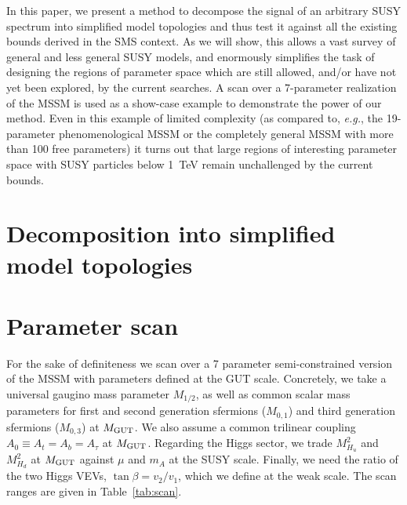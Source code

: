 \documentclass[12pt]{article}
\def\eg{{\it e.g.}}
\def\mgut{M_{\rm GUT}}
\begin{document}
In this paper, we present a method to decompose the signal of an arbitrary SUSY spectrum into simplified model  
topologies and thus test it against all the existing bounds derived in the SMS context. 
As we will show, this allows a vast survey of general and less general SUSY models, and enormously simplifies the task of designing the regions of parameter space which are still allowed, and/or have not yet been explored, by the current searches.
A scan over a 7-parameter realization of the MSSM is used as a show-case example to demonstrate the power of our method. 
Even in this example of limited complexity (as compared to, \eg, the 19-parameter phenomenological MSSM or the completely general MSSM with more than 100 free parameters) it turns out that large regions of interesting parameter space with SUSY particles below 1~TeV %
remain unchallenged by the current bounds.




\section{Decomposition into simplified model topologies}


\section{Parameter scan}

For the sake of definiteness we scan over a 7 parameter semi-constrained version of the MSSM 
with parameters defined at the GUT scale. 
Concretely, we take a universal gaugino mass parameter $M_{1/2}$,  as well as common scalar mass parameters 
for first and second generation sfermions ($M_{0,1}$) and third generation sfermions ($M_{0,3}$) at $\mgut$.  
We also assume a common trilinear coupling $A_0\equiv A_t=A_b=A_\tau$ at $\mgut$. 
Regarding the Higgs sector,  we trade $M_{H_u}^2$ and $M_{H_d}^2$ at $\mgut$ against 
$\mu$ and $m_A$ at the SUSY scale. Finally, we need the ratio of the two Higgs VEVs, $\tan\beta=v_2/v_1$, 
which we define at the weak scale. 
The scan ranges are given in Table~\ref{tab:scan}.
\end{document}
